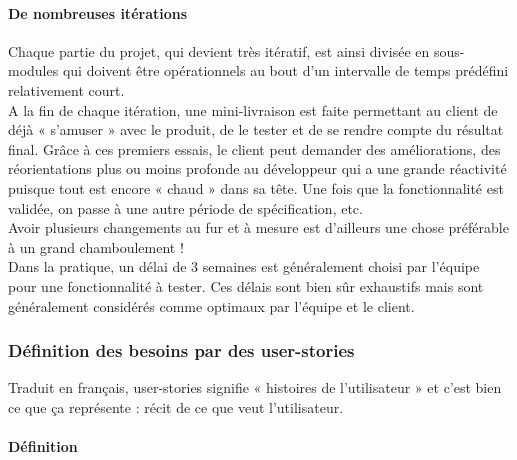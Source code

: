 \documentclass[]{article}
\let\oldparagraph\paragraph
\renewcommand{\paragraph}[1]{\oldparagraph{#1}\mbox{}}
\begin{document}
\hypertarget{de-nombreuses-ituxe9rations}{%
\paragraph{De nombreuses itérations}\label{de-nombreuses-ituxe9rations}}

Chaque partie du projet, qui devient très itératif, est ainsi divisée en
sous-modules qui doivent être opérationnels au bout d'un intervalle de
temps prédéfini relativement court.~\\
A la fin de chaque itération, une mini-livraison est faite permettant au
client de déjà « s'amuser » avec le produit, de le tester et de se
rendre compte du résultat final. Grâce à ces premiers essais, le client
peut demander des améliorations, des réorientations plus ou moins
profonde au développeur qui a une grande réactivité puisque tout est
encore « chaud » dans sa tête. Une fois que la fonctionnalité est
validée, on passe à une autre période de spécification, etc.~\\
Avoir plusieurs changements au fur et à mesure est d'ailleurs une chose
préférable à un grand chamboulement !\\
Dans la pratique, un délai de 3 semaines est généralement choisi par
l'équipe pour une fonctionnalité à tester. Ces délais sont bien sûr
exhaustifs mais sont généralement considérés comme optimaux par l'équipe
et le client.




\hypertarget{duxe9finition-des-besoins-par-des-user-stories}{%
\subsubsection{Définition des besoins par des
user-stories}\label{duxe9finition-des-besoins-par-des-user-stories}}

Traduit en français, user-stories signifie « histoires de l'utilisateur
» et c'est bien ce que ça représente : récit de ce que veut
l'utilisateur.




\hypertarget{duxe9finition}{%
\paragraph{Définition}\label{duxe9finition}}
\end{document}
